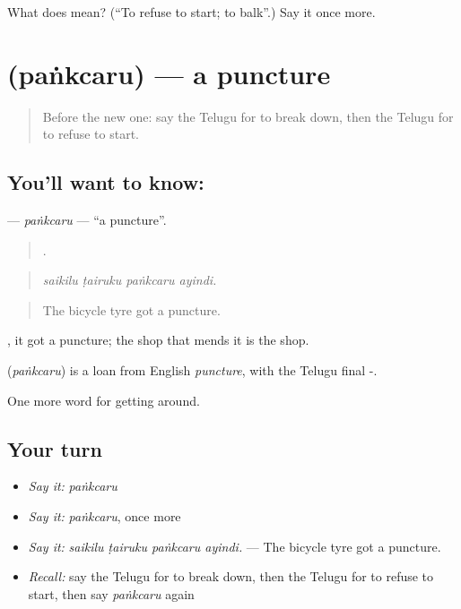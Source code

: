 \begin{tcolorbox}[breakable,colback=teal!4,colframe=teal!35!black,title={Before you move on}]
What does  mean? (\textquotedblleft{}To refuse to start; to balk\textquotedblright{}.) Say it once more.
\end{tcolorbox}
\section[\texorpdfstring{\te{పంక్చరు} (paṅkcaru)}{పంక్చరు (paṅkcaru)}]{ (paṅkcaru) — a puncture}

\label{lesson:TE-C444-pankcaru}



\begin{quote}
Before the new one: say the Telugu for to break down, then the Telugu for to refuse to start.
\end{quote}

\subsection*{You'll want to know: }
\textbf{} — \emph{paṅkcaru} — \textquotedblleft{}a puncture\textquotedblright{}.

\begin{quote}
   .
\end{quote}

\begin{quote}
\emph{saikilu ṭairuku paṅkcaru ayindi.}
\end{quote}

\begin{quote}
The bicycle tyre got a puncture.
\end{quote}

 , it got a puncture; the shop that mends it is the  shop.

\begin{cousinweb}
\textbf{} (\emph{paṅkcaru}) is a loan from English \emph{puncture}, with the Telugu final -.
\end{cousinweb}

\begin{grammarlens}[title={What you've built}]
One more word for getting around.
\end{grammarlens}

\subsection*{Your turn}
\begin{itemize}
\raggedright
  \item \emph{Say it:} \emph{paṅkcaru}
  \item \emph{Say it:} \emph{paṅkcaru}, once more
  \item \emph{Say it:} \emph{saikilu ṭairuku paṅkcaru ayindi.} — The bicycle tyre got a puncture.
  \item \emph{Recall:} say the Telugu for to break down, then the Telugu for to refuse to start, then say \emph{paṅkcaru} again
\end{itemize}


